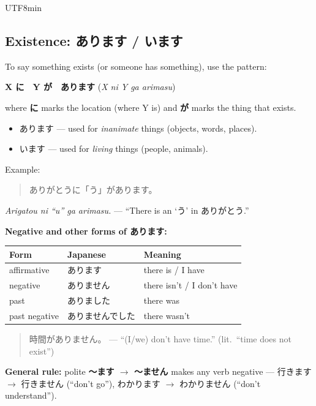 \documentclass[11pt]{article}
\begin{document}
\begin{CJK}{UTF8}{min}
\subsection{Existence: \texorpdfstring{あります}{arimasu} / \texorpdfstring{います}{imasu}}
To say something exists (or someone has something), use the pattern:
\begin{center}
  \textbf{X に　Y が　あります} \quad(\emph{X ni Y ga arimasu})
\end{center}
where \textbf{に} marks the location (where Y is) and \textbf{が} marks the
thing that exists.

\begin{itemize}
  \item あります --- used for \emph{inanimate} things (objects, words, places).
  \item います --- used for \emph{living} things (people, animals).
\end{itemize}

Example:
\begin{quote}
ありがとうに「う」があります。
\end{quote}
\emph{Arigatou ni ``u'' ga arimasu.} --- ``There is an `う' in ありがとう.''

\textbf{Negative and other forms of あります:}
\begin{center}
\begin{tabular}{@{}lll@{}}
\toprule
Form & Japanese & Meaning \\
\midrule
affirmative   & あります             & there is / I have \\
negative      & ありません           & there isn't / I don't have \\
past          & ありました           & there was \\
past negative & ありませんでした     & there wasn't \\
\bottomrule
\end{tabular}
\end{center}
\begin{quote}
時間がありません。 --- ``(I/we) don't have time.'' (lit.\ ``time does not exist'')
\end{quote}

\textbf{General rule:} polite \textbf{〜ます $\rightarrow$ 〜ません} makes any verb
negative --- 行きます $\rightarrow$ 行きません (``don't go''),
わかります $\rightarrow$ わかりません (``don't understand'').


\end{CJK}
\end{document}
